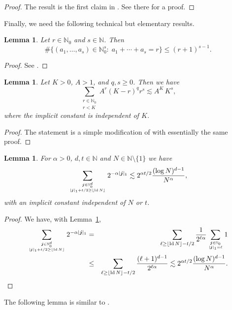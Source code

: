 \documentclass[12pt, a4paper]{article}
\newtheorem{lem}[thm]{Lemma}
\newcommand{\ld}{{\rm ld}\,}
\newcommand{\N}{{\mathbb{N}}} %
\newcommand{\bsj}{{\boldsymbol{j}}}
\newcommand{\bbN}{{\mathbb{N}}}
\begin{document}
\begin{proof}
The result is the first claim in \cite[Proof of Theorem~2.2]{DHMP16}. See there for a proof.   
\end{proof}

Finally, we need the following technical but elementary results. 

\begin{lem}\label{index_dim_red}
Let $r\in\N_0$ and $s\in\N$. Then
\[ \#\{(a_1,\ldots,a_s)\in\N_0^s:\; a_1 + \cdots + a_s = r\} \leq (r + 1)^{s-1}. \]
\end{lem}

\begin{proof}
See \cite[Proof of Lemma~16.26]{DP10}.
\end{proof}

\begin{lem}\label{index_dim_red_log}
Let $K > 0$, $A>1$, and $q,s \ge 0$. Then we have
\[ \sum_{\substack{r \in \bbN_0 \\ r < K}} A^r (K-r)^q r^s \lesssim A^K\,K^s, \]
 where the implicit constant is independent of $K$.
\end{lem}

\begin{proof}
The statement is a simple modification of \cite[Lemma~5.2]{M15} with essentially the same proof.
\end{proof}

\begin{lem}\label{le4}
For $\alpha >0$, $d, t \in \bbN$ and $N \in \bbN \setminus \{1\}$ we have
$$\sum_{\bsj \in \bbN_{0}^d \atop |\bsj|_1+t/2\geq \lfloor\ld N\rfloor} 2^{- \alpha |\bsj|_1} \lesssim  2^{\alpha t/2} \frac{(\log N)^{d-1}}{N^{\alpha}},$$
with an implicit constant independent of $N$ or $t$.
\end{lem}

\begin{proof}
We have, with Lemma~\ref{index_dim_red},
\begin{eqnarray*}
\sum_{\bsj \in \bbN_{0}^d \atop |\bsj|_1+t/2\geq \lfloor\ld N\rfloor} 2^{- \alpha |\bsj|_1}  & = & \sum_{\ell \ge \lfloor\ld N\rfloor - t/2} \frac{1}{2^{\ell \alpha}} \sum_{\bsj \in \bbN_0 \atop |\bsj|_1=\ell} 1 \\
& \le & \sum_{\ell \ge \lfloor\ld N\rfloor - t/2} \frac{(\ell+1)^{d-1}}{2^{\ell \alpha}} \lesssim  2^{\alpha t/2} \frac{(\log N)^{d-1}}{N^{\alpha}}.
\end{eqnarray*}
\end{proof}


The following lemma is similar to \cite[Lemma~13.24]{DP10}.
\end{document}

